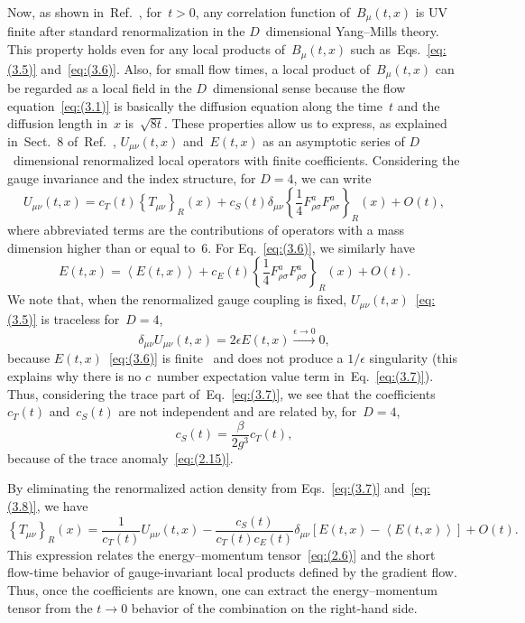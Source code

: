 Now, as shown in~Ref.~\cite{Luscher:2011bx}, for~$t>0$, any correlation
function of~$B_\mu(t,x)$ is UV finite after standard renormalization in the
$D$~dimensional Yang--Mills theory. This property holds even for any local
products of~$B_\mu(t,x)$ such as~Eqs.~\eqref{eq:(3.5)} and~\eqref{eq:(3.6)}.
Also, for small flow times, a local product of~$B_\mu(t,x)$ can be regarded as
a local field in the $D$~dimensional sense because the flow
equation~\eqref{eq:(3.1)} is basically the diffusion equation along the
time~$t$ and the diffusion length in~$x$ is~$\sqrt{8t}$. These properties allow
us to express, as explained in~Sect.~8 of~Ref.~\cite{Luscher:2011bx},
$U_{\mu\nu}(t,x)$ and~$E(t,x)$ as an asymptotic series of $D$~dimensional
renormalized local operators with finite coefficients. Considering the gauge
invariance and the index structure, for $D=4$, we can write
\begin{equation}
   U_{\mu\nu}(t,x)
   =c_T(t)\left\{T_{\mu\nu}\right\}_R(x)
   +c_S(t)\delta_{\mu\nu}
   \left\{\frac{1}{4}F_{\rho\sigma}^aF_{\rho\sigma}^a\right\}_R(x)
   +O(t),
\label{eq:(3.7)}
\end{equation}
where abbreviated terms are the contributions of operators with a mass
dimension higher than or equal to~$6$. For Eq.~\eqref{eq:(3.6)}, we similarly
have
\begin{equation}
   E(t,x)
   =\left\langle E(t,x)\right\rangle
   +c_E(t)\left\{\frac{1}{4}F_{\rho\sigma}^aF_{\rho\sigma}^a\right\}_R(x)
   +O(t).
\label{eq:(3.8)}
\end{equation}
We note that, when the renormalized gauge coupling is fixed,
$U_{\mu\nu}(t,x)$~\eqref{eq:(3.5)} is traceless for~$D=4$,
\begin{equation}
   \delta_{\mu\nu}U_{\mu\nu}(t,x)
   =2\epsilon E(t,x)\xrightarrow{\epsilon\to0}0,
\label{eq:(3.9)}
\end{equation}
because $E(t,x)$~\eqref{eq:(3.6)} is finite~\cite{Luscher:2010iy} and does not
produce a $1/\epsilon$ singularity (this explains why there is no $c$~number
expectation value term in~Eq.~\eqref{eq:(3.7)}). Thus, considering the trace
part of~Eq.~\eqref{eq:(3.7)}, we see that the coefficients $c_T(t)$
and~$c_S(t)$ are not independent and are related by, for~$D=4$,
\begin{equation}
   c_S(t)=\frac{\beta}{2g^3}c_T(t),
\label{eq:(3.10)}
\end{equation}
because of the trace anomaly~\eqref{eq:(2.15)}.

By eliminating the renormalized action density from Eqs.~\eqref{eq:(3.7)}
and~\eqref{eq:(3.8)}, we have
\begin{equation}
   \left\{T_{\mu\nu}\right\}_R(x)
   =\frac{1}{c_T(t)}U_{\mu\nu}(t,x)
   -\frac{c_S(t)}{c_T(t)c_E(t)}\delta_{\mu\nu}
   \left[E(t,x)
   -\left\langle E(t,x)\right\rangle
   \right]
   +O(t).
\label{eq:(3.11)}
\end{equation}
This expression relates the energy--momentum tensor~\eqref{eq:(2.6)} and the
short flow-time behavior of gauge-invariant local products defined by the
gradient flow. Thus, once the coefficients are known, one can extract the
energy--momentum tensor from the $t\to0$ behavior of the combination on the
right-hand side.
